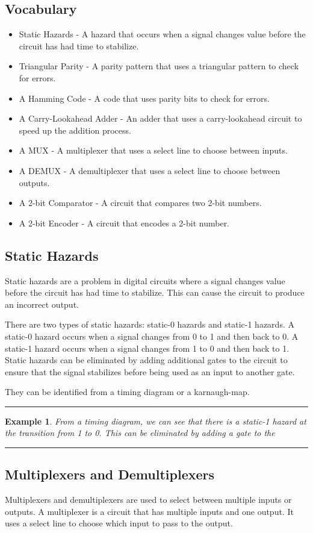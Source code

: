 \documentclass[12pt]{article}
\newtheorem{example}{Example}
\newenvironment{examp}
{
    \vspace{0.5cm}
    \hrule
    \begin{example}\upshape
}
{
    \end{example}
    \hrule
    \vspace{0.5cm}
}
\begin{document}
\subsection{Vocabulary}
\begin{itemize}
	\item Static Hazards - A hazard that occurs when a signal changes value
	      before the circuit has had time to stabilize.
	\item Triangular Parity - A parity pattern that uses a triangular pattern to check for errors.
	\item A Hamming Code - A code that uses parity bits to check for errors.
	\item A Carry-Lookahead Adder - An adder that uses a carry-lookahead circuit to speed up the addition process.
	\item A MUX - A multiplexer that uses a select line to choose between inputs.
	\item A DEMUX - A demultiplexer that uses a select line to choose between outputs.
	\item A 2-bit Comparator - A circuit that compares two 2-bit numbers.
	\item A 2-bit Encoder - A circuit that encodes a 2-bit number.
\end{itemize}
\subsection{Static Hazards}
Static hazards are a problem in digital circuits where a signal changes value
before the circuit has had time to stabilize. This can cause the circuit to
produce an incorrect output.

There are two types of static hazards: static-0
hazards and static-1 hazards. A static-0 hazard occurs when a signal changes
from 0 to 1 and then back to 0. A static-1 hazard occurs when a signal changes
from 1 to 0 and then back to 1. Static hazards can be eliminated by adding
additional gates to the circuit to ensure that the signal stabilizes before
being used as an input to another gate.

They can be identified from a timing diagram or a karnaugh-map.
\begin{examp}
	From a timing diagram, we can see that there is a static-1 hazard at the
	transition from 1 to 0. This can be eliminated by adding a gate to the
\end{examp}

\subsection{Multiplexers and Demultiplexers}
Multiplexers and demultiplexers are used to select between multiple inputs or
outputs. A multiplexer is a circuit that has multiple inputs and one output. It
uses a select line to choose which input to pass to the output.
\end{document}
